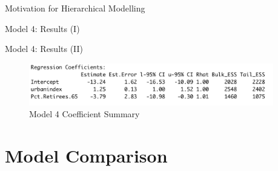 \documentclass{beamer}
\begin{document}
\begin{frame}{Motivation for Hierarchical Modelling}
\begin{frame}{Model 4: Results (I)}
\end{frame}

\begin{frame}{Model 4: Results (II)}

    \begin{figure}
        \caption{Model 4 Coefficient Summary}
        \includegraphics[width=0.95\textwidth]{plots/model4_coeff.png}
    \end{figure}
\end{frame}




\section{Model Comparison}

        
   





\end{frame}
\end{document}
